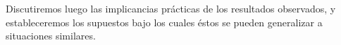 \documentclass[12pt, a4paper]{article}
\begin{document}
Discutiremos luego las implicancias pr\'acticas de los resultados observados, y estableceremos los supuestos bajo los cuales \'estos se pueden generalizar a situaciones similares.


\pagebreak

%

\pagebreak


%

\pagebreak


%

\pagebreak

%

\pagebreak

%

\pagebreak

%
\end{document}
